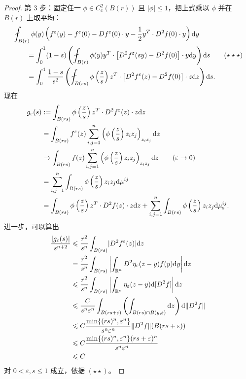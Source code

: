\documentclass[../../main.tex]{subfiles}%
\begin{document}
\begin{proof}
第 3 步：固定任一 $\phi\in C_{c}^{2}(B(r))$ 且 $\lvert\phi\rvert\leqslant1$，把上式乘以 $\phi$ 并在 $B(r)$ 上取平均：
\begin{align*}
&\fint_{B(r)}\phi(y)\left(f^{\varepsilon}(y)-f^{\varepsilon}(0)-Df^{\varepsilon}(0)\cdot y-\frac{1}{2}y^{T}\cdot D^{2}f(0)\cdot y\right)\diff y\\
&\qquad=\int_{0}^{1}(1-s)\left(\fint_{B(r)}\phi(y)y^{T}\cdot\bigl[D^{2}f^{\varepsilon}(sy)-D^{2}f(0)\bigr]\cdot y\diff y\right)\diff s\qquad(\star\star\star)\\
&\qquad=\int_{0}^{1}\frac{1-s}{s^{2}}\left(\fint_{B(rs)}\phi\left(\frac{z}{s}\right)z^{T}\cdot\bigl[D^{2}f^{\varepsilon}(z)-D^{2}f(0)\bigr]\cdot z\diff z\right)\diff s.
\end{align*}
现在
\begin{align*}
g_{\varepsilon}(s)&:=\int_{B(rs)}\phi\left(\frac{z}{s}\right)z^{T}\cdot D^{2}f^{\varepsilon}(z)\cdot z\mathrm{d} z\\
&=\int_{B(rs)}f^{\varepsilon}(z)\sum_{i,j=1}^{n}\left(\phi\left(\frac{z}{s}\right)z_{i}z_{j}\right)_{z_{i}z_{j}}\mathrm{d} z\\
&\to\int_{B(rs)}f(z)\sum_{i,j=1}^{n}\left(\phi\left(\frac{z}{s}\right)z_{i}z_{j}\right)_{z_{i}z_{j}}\mathrm{d} z\qquad(\varepsilon\to0)\\
&=\sum_{i,j=1}^{n}\int_{B(rs)}\phi\left(\frac{z}{s}\right)z_{i}z_{j}\mathrm{d}\mu^{ij}\\
&=\int_{B(rs)}\phi\left(\frac{z}{s}\right)z^{T}\cdot D^{2}f(z)\cdot z\mathrm{d} z+\sum_{i,j=1}^{n}\int_{B(rs)}\phi\left(\frac{z}{s}\right)z_{i}z_{j}\mathrm{d}\mu_{\mathrm{s}}^{ij}.
\end{align*}
进一步，可以算出
\begin{align*}
\frac{\lvert g_{\varepsilon}(s)\rvert}{s^{n+2}}&\leqslant\frac{r^{2}}{s^{n}}\int_{B(rs)}\lvert D^{2}f^{\varepsilon}(z)\rvert\mathrm{d} z\\
&=\frac{r^{2}}{s^{n}}\int_{B(rs)}\left|\int_{\mathbb{R}^{n}}D^{2}\eta_{\varepsilon}(z-y)f(y)\mathrm{d} y\right|\mathrm{d} z\\
&\leqslant\frac{r^{2}}{s^{n}}\int_{B(rs)}\left|\int_{\mathbb{R}^{n}}\eta_{\varepsilon}(z-y)\mathrm{d}[D^{2}f]\right|\mathrm{d} z\\
&\leqslant\frac{C}{s^{n}\varepsilon^{n}}\int_{B(rs+\varepsilon)}\left(\int_{B(rs)\cap B(y,\varepsilon)}\mathrm{d} z\right)\mathrm{d}\lVert D^{2}f\rVert\\
&\leqslant C\frac{\min\{(rs)^{n},\varepsilon^{n}\}}{s^{n}\varepsilon^{n}}\lVert D^{2}f\rVert(B(rs+\varepsilon))\\
&\leqslant C\frac{\min\{(rs)^{n},\varepsilon^{n}\}(rs+\varepsilon)^{n}}{s^{n}\varepsilon^{n}}\\
&\leqslant C
\end{align*}
对 $0<\varepsilon,s\leqslant1$ 成立，依据 $(\star\star)$。


\end{proof}
\end{document}
